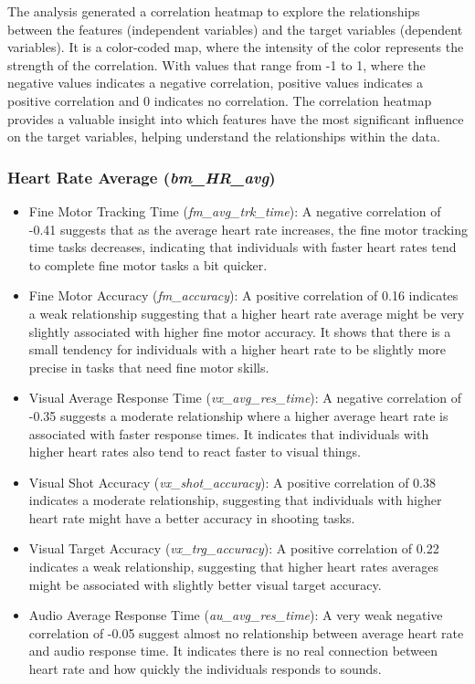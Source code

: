 The analysis generated a correlation heatmap to explore the relationships between the features (independent variables) and the target variables (dependent variables).
It is a color-coded map, where the intensity of the color represents the strength of the correlation. With values that range from -1 to 1, where the negative values indicates a negative
correlation, positive values indicates a positive correlation and 0 indicates no correlation. The correlation heatmap provides a valuable insight into which features have the most 
significant influence on the target variables, helping understand the relationships within the data.

\subsubsection*{Heart Rate Average (\textit{bm\_HR\_avg})}
\begin{itemize}
    \item Fine Motor Tracking Time (\textit{fm\_avg\_trk\_time}): A negative correlation of \\ -0.41 suggests that as the average heart rate increases, the fine motor
    tracking time tasks decreases, indicating that individuals with faster heart rates tend to complete fine motor tasks a bit quicker.
    \item Fine Motor Accuracy (\textit{fm\_accuracy}): A positive correlation of 0.16 indicates a weak relationship suggesting that a higher heart rate average might be very 
    slightly associated with higher fine motor accuracy. It shows that there is a small tendency for individuals with a higher heart rate to be slightly more precise
    in tasks that need fine motor skills.
    \item Visual Average Response Time (\textit{vx\_avg\_res\_time}): A negative correlation of -0.35 suggests a moderate relationship where a higher average heart rate
    is associated with faster response times. It indicates that individuals with higher heart rates also tend to react faster to visual things.
    \item Visual Shot Accuracy (\textit{vx\_shot\_accuracy}): A positive correlation of 0.38 indicates a moderate relationship, suggesting that individuals with higher heart
    rate might have a better accuracy in shooting tasks.
    \item Visual Target Accuracy (\textit{vx\_trg\_accuracy}): A positive correlation of 0.22 indicates a weak relationship, suggesting that higher heart rates averages might
    be associated with slightly better visual target accuracy.
    \item Audio Average Response Time (\textit{au\_avg\_res\_time}): A very weak negative correlation of -0.05 suggest almost no relationship between average heart rate
    and audio response time. It indicates there is no real connection between heart rate and how quickly the individuals responds to sounds.
\end{itemize}

